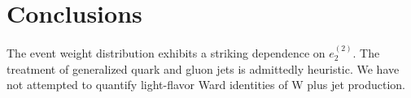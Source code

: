 \section{Conclusions}\label{sec:conclusions}

The event weight distribution exhibits a striking dependence on
$e_2^{(2)}$. The treatment of generalized quark and gluon jets is
admittedly heuristic. We have not attempted to quantify light-flavor
Ward identities of W plus jet production.


